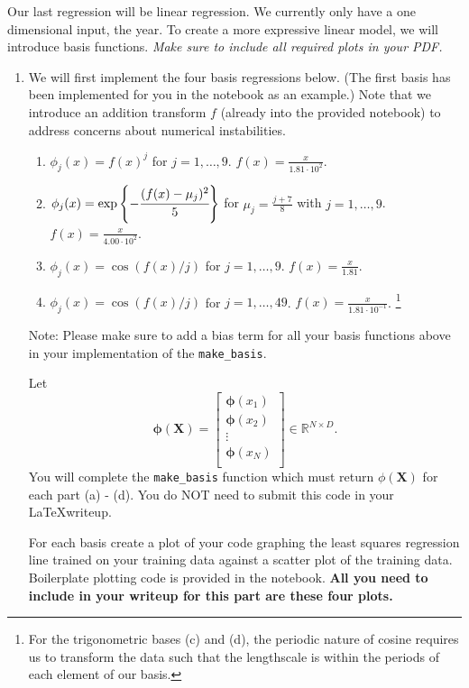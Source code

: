 \documentclass[submit]{harvardml}
\begin{document}
\newpage
\begin{problem}

Our last regression will be linear regression.  We currently only have
a one dimensional input, the year.  To create a more expressive linear
model, we will introduce basis functions.
\vspace{1em}
\noindent\emph{Make sure to include all required plots in your PDF.}

\begin{enumerate}
\item 
We will first implement the four basis regressions below. (The first basis has been implemented for you in the notebook as an example.) Note that we introduce an addition transform $f$ (already into the provided notebook) to address concerns about numerical instabilities.
\begin{enumerate}
  \item $\phi_j(x)= f(x)^j$ for $j=1,\ldots, 9$. $f(x) = \frac{x}{1.81 \cdot 10^{2}}.$
  \item $\phi_j(x) = \exp\left\{-\cfrac{(f(x)-\mu_j)^2}{5}\right\}$ for $\mu_j=\frac{j + 7}{8}$ with $j=1,\ldots, 9$. $f(x) = \frac{x}{4.00 \cdot 10^{2}}.$
  \item $\phi_j(x) =  \cos(f(x) / j)$ for $j=1, \ldots, 9$. $f(x) = \frac{x}{1.81}$.
  \item $\phi_j(x) = \cos(f(x) / j)$ for $j=1, \ldots, 49$. $f(x) = \frac{x}{1.81 \cdot 10^{-1}}$. \footnote{For the trigonometric bases (c) and (d), the periodic nature of
cosine requires us to transform the data such that the 
lengthscale is within the periods of each element of our basis.}
\end{enumerate}

{\footnotesize * Note: Please make sure to add a bias term for
all your basis functions above in your implementation of the 
\verb|make_basis|.}

Let 
$$ \mathbf{\phi}(\mathbf{X}) = 
\begin{bmatrix} 
\mathbf{\phi}(x_1) \\
\mathbf{\phi}(x_2) \\
\vdots \\
\mathbf{\phi}(x_N) \\
\end{bmatrix} \in \mathbb{R}^{N\times D}.$$
You will complete the \verb|make_basis| function which must return
$\phi(\mathbf{X})$ for each part 
(a) - (d). You do NOT need to submit this
code in your \LaTeX writeup.

For each basis create a plot of your code graphing the least squares
regression line trained on your training data against a scatter plot
of the training data. Boilerplate plotting code is provided in the
notebook.
\textbf{All you need to include 
in your writeup for this part are these four plots.}
\vspace{1em}
\end{enumerate}
\end{problem}
\end{document}
